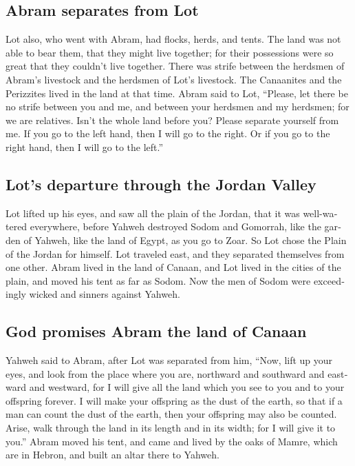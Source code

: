 \begin{paracol}{2}
\begin{otherlanguage}{english}
\hypertarget{abram-separates-from-lot}{%
\subsection{Abram separates from Lot}\label{abram-separates-from-lot}}

 Lot also, who went with Abram, had flocks, herds, and
tents.  The land was not able to bear them, that they
might live together; for their possessions were so great that they
couldn't live together.  There was strife between the
herdsmen of Abram's livestock and the herdsmen of Lot's livestock. The
Canaanites and the Perizzites lived in the land at that time.
 Abram said to Lot, ``Please, let there be no strife
between you and me, and between your herdsmen and my herdsmen; for we
are relatives.  Isn't the whole land before you? Please
separate yourself from me. If you go to the left hand, then I will go to
the right. Or if you go to the right hand, then I will go to the left.''

\hypertarget{lots-departure-through-the-jordan-valley}{%
\subsection{Lot's departure through the Jordan
Valley}\label{lots-departure-through-the-jordan-valley}}

 Lot lifted up his eyes, and saw all the plain of the
Jordan, that it was well-watered everywhere, before Yahweh destroyed
Sodom and Gomorrah, like the garden of Yahweh, like the land of Egypt,
as you go to Zoar.  So Lot chose the Plain of the Jordan
for himself. Lot traveled east, and they separated themselves from one
other.  Abram lived in the land of Canaan, and Lot lived
in the cities of the plain, and moved his tent as far as Sodom.
 Now the men of Sodom were exceedingly wicked and sinners
against Yahweh.

\hypertarget{god-promises-abram-the-land-of-canaan}{%
\subsection{God promises Abram the land of
Canaan}\label{god-promises-abram-the-land-of-canaan}}

 Yahweh said to Abram, after Lot was separated from him,
``Now, lift up your eyes, and look from the place where you are,
northward and southward and eastward and westward,  for I
will give all the land which you see to you and to your offspring
forever.  I will make your offspring as the dust of the
earth, so that if a man can count the dust of the earth, then your
offspring may also be counted.  Arise, walk through the
land in its length and in its width; for I will give it to you.''
 Abram moved his tent, and came and lived by the oaks of
Mamre, which are in Hebron, and built an altar there to Yahweh.


\end{otherlanguage}
\end{paracol}

